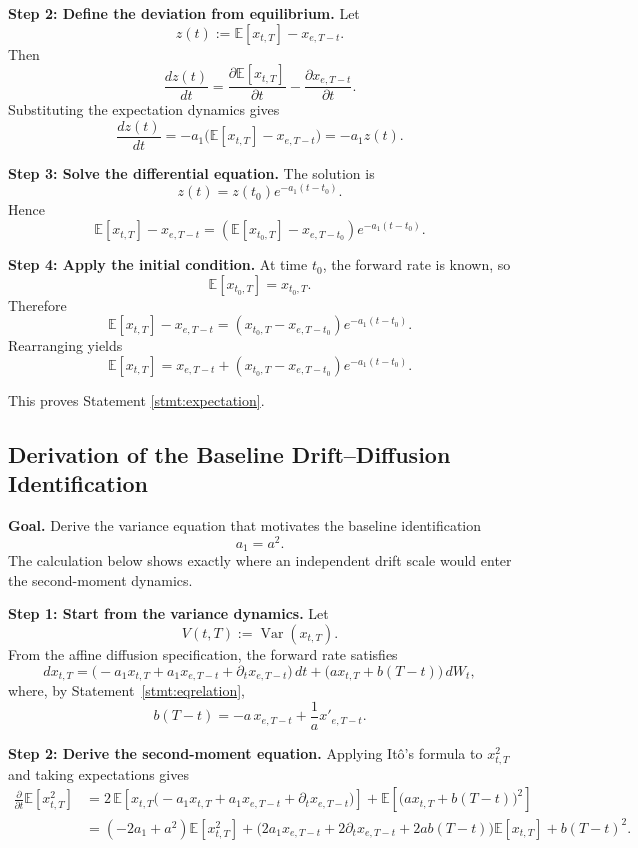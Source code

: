 \documentclass[12pt]{article}
\theoremstyle{statementstyle}
\begin{document}
\begin{appendices}
\medskip
\noindent\textbf{Step 2: Define the deviation from equilibrium.}
Let
\[
z(t):=\mathbb{E}[x_{t,T}] - x_{e,T-t}.
\]
Then
\[
\frac{dz(t)}{dt}
=
\frac{\partial \mathbb{E}[x_{t,T}]}{\partial t}
-
\frac{\partial x_{e,T-t}}{\partial t}.
\]
Substituting the expectation dynamics gives
\[
\frac{dz(t)}{dt}
=
-a_1\bigl(\mathbb{E}[x_{t,T}] - x_{e,T-t}\bigr)
=
-a_1 z(t).
\]

\medskip
\noindent\textbf{Step 3: Solve the differential equation.}
The solution is
\[
z(t)=z(t_0)e^{-a_1(t-t_0)}.
\]
Hence
\[
\mathbb{E}[x_{t,T}] - x_{e,T-t}
=
\left(\mathbb{E}[x_{t_0,T}] - x_{e,T-t_0}\right)e^{-a_1(t-t_0)}.
\]

\medskip
\noindent\textbf{Step 4: Apply the initial condition.}
At time \(t_0\), the forward rate is known, so
\[
\mathbb{E}[x_{t_0,T}] = x_{t_0,T}.
\]
Therefore
\[
\mathbb{E}[x_{t,T}] - x_{e,T-t}
=
\left(x_{t_0,T} - x_{e,T-t_0}\right)e^{-a_1(t-t_0)}.
\]
Rearranging yields
\begin{equation}
\mathbb{E}[x_{t,T}]
=
x_{e,T-t}
+
\left(x_{t_0,T}-x_{e,T-t_0}\right)e^{-a_1(t-t_0)}.
\tag{A.3.1}\label{eq:A31}
\end{equation}

This proves Statement \ref{stmt:expectation}.
\subsection{Derivation of the Baseline Drift--Diffusion Identification}
\label{appendix:A4}

\textbf{Goal.}
Derive the variance equation that motivates the baseline identification
\[
a_1=a^2.
\]
The calculation below shows exactly where an independent drift scale would enter
the second-moment dynamics.

\medskip
\noindent\textbf{Step 1: Start from the variance dynamics.}
Let
\[
V(t,T):=\operatorname{Var}(x_{t,T}).
\]
From the affine diffusion specification, the forward rate satisfies
\[
dx_{t,T}
=
\bigl(-a_1x_{t,T}+a_1x_{e,T-t}+\partial_t x_{e,T-t}\bigr)\,dt
+
\bigl(a x_{t,T}+b(T-t)\bigr)\,dW_t,
\]
where, by Statement~\ref{stmt:eqrelation},
\[
b(T-t)=-a\,x_{e,T-t}+\frac{1}{a}x'_{e,T-t}.
\]

\medskip
\noindent\textbf{Step 2: Derive the second-moment equation.}
Applying It\^o's formula to \(x_{t,T}^2\) and taking expectations gives
\begin{align}
\frac{\partial}{\partial t}\mathbb{E}[x_{t,T}^2]
&=
2\,\mathbb{E}\!\left[x_{t,T}
\bigl(-a_1x_{t,T}+a_1x_{e,T-t}+\partial_t x_{e,T-t}\bigr)\right]
+
\mathbb{E}\!\left[\bigl(a x_{t,T}+b(T-t)\bigr)^2\right]
\nonumber\\
&=
(-2a_1+a^2)\mathbb{E}[x_{t,T}^2]
+
\bigl(2a_1x_{e,T-t}+2\partial_t x_{e,T-t}+2ab(T-t)\bigr)\mathbb{E}[x_{t,T}]
+
b(T-t)^2.
\tag{A.4.1}\label{eq:A41}
\end{align}


\end{appendices}
\end{document}

